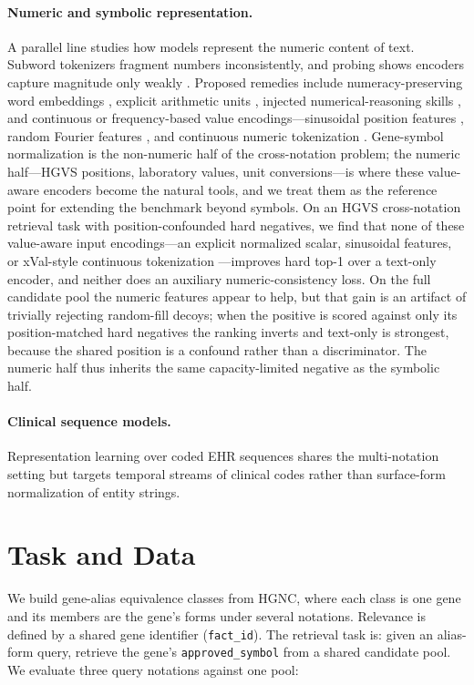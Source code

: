 \documentclass[11pt]{article}
\begin{document}
\paragraph{Numeric and symbolic representation.} A parallel line studies how models
represent the numeric content of text. Subword tokenizers fragment numbers
inconsistently, and probing shows encoders capture magnitude only weakly
\citep{wallace2019, thawani2021representing}. Proposed remedies include
numeracy-preserving word embeddings \citep{spithourakis2018numeracy,
sundararaman2020numeracy}, explicit arithmetic units \citep{trask2018nalu},
injected numerical-reasoning skills \citep{geva2020injecting}, and continuous or
frequency-based value encodings---sinusoidal position features
\citep{vaswani2017attention}, random Fourier features \citep{tancik2020fourier}, and
continuous numeric tokenization \citep{xval}. Gene-symbol normalization is the
non-numeric half of the cross-notation problem; the numeric half---HGVS positions,
laboratory values, unit conversions---is where these value-aware encoders become the
natural tools, and we treat them as the reference point for extending the benchmark
beyond symbols. On an HGVS cross-notation retrieval task with position-confounded
hard negatives, we find that none of these value-aware input encodings---an explicit
normalized scalar, sinusoidal features, or xVal-style continuous tokenization
\citep{xval}---improves hard top-1 over a text-only encoder, and neither does an
auxiliary numeric-consistency loss. On the full candidate pool the numeric features
appear to help, but that gain is an artifact of trivially rejecting random-fill
decoys; when the positive is scored against only its position-matched hard negatives
the ranking inverts and text-only is strongest, because the shared position is a
confound rather than a discriminator. The numeric half thus inherits the same
capacity-limited negative as the symbolic half.
\paragraph{Clinical sequence models.} Representation learning over coded EHR
sequences \citep{medbert, behrt, clmbr, gbert} shares the multi-notation setting
but targets temporal streams of clinical codes rather than surface-form
normalization of entity strings.

\section{Task and Data}
\label{sec:data}
We build gene-alias equivalence classes from HGNC, where each class is one gene and
its members are the gene's forms under several notations. Relevance is defined by a
shared gene identifier (\texttt{fact\_id}). The retrieval task is: given an
alias-form query, retrieve the gene's \texttt{approved\_symbol} from a shared
candidate pool. We evaluate three query notations against one pool:
\end{document}
